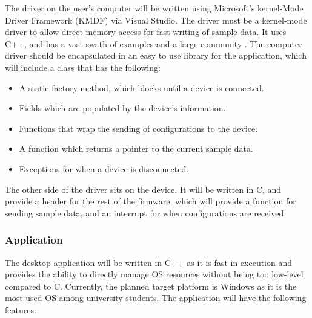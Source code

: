 \documentclass[letterpaper,12pt]{article}
\begin{document}
The driver on the user's computer will be written using Microsoft's kernel-Mode
Driver Framework (KMDF) via Visual Studio. The driver must be a kernel-mode
driver to allow direct memory access for fast writing of sample data. It uses
C++, and has a vast swath of examples and a large community
\cite{microsoft_driver_stuff}. The computer driver should be encapsulated in an
easy to use library for the application, which will include a class that has the
following:

\begin{itemize}
    \item A static factory method, which blocks until a device is connected.
    \item Fields which are populated by the device's information.
    \item Functions that wrap the sending of configurations to the device.
    \item A function which returns a pointer to the current sample data.
    \item Exceptions for when a device is disconnected.
\end{itemize}
\noindent
The other side of the driver sits on the device. It will be written in C, and
provide a header for the rest of the firmware, which will provide a function for
sending sample data, and an interrupt for when configurations are received.

\subsubsection{Application} %
The desktop application will be written in C++ as it is fast in execution and
provides the ability to directly manage OS resources without being too low-level
compared to C. Currently, the planned target platform is Windows as it is the
most used OS among university students. The application will have the following
features: \\
\end{document}
